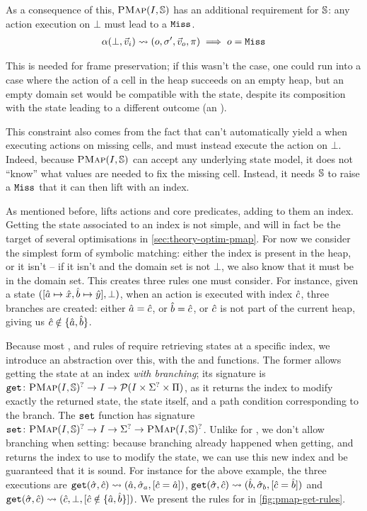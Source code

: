 As a consequence of this, $\textsc{PMap}(I,\mathbb S)$ has an additional requirement for $\mathbb S$: any action execution on $\bot$ must lead to a $\texttt{Miss}$. \begin{align*}
	\alpha(\bot,\vec{v}_i)\rightsquigarrow(o,\sigma',\vec{v}_o,\pi) \implies o=\texttt{Miss}
\end{align*}

This is needed for frame preservation; if this wasn't the case, one could run into a case where the action of a cell in the heap succeeds on an empty heap, but an empty domain set would be compatible with the state, despite its composition with the state leading to a different outcome (an \Err).

This constraint also comes from the fact that \PMap{} can't automatically yield a \Miss{} when executing actions on missing cells, and must instead execute the action on $\bot$. Indeed, because $\textsc{PMap}(I,\mathbb S)$ can accept any underlying state model, it does not ``know'' what values are needed to fix the missing cell. Instead, it needs $\mathbb S$ to raise a $\texttt{Miss}$ that it can then lift with an index.

As mentioned before, \PMap{} lifts actions and core predicates, adding to them an index. Getting the state associated to an index is not simple, and will in fact be the target of several optimisations in \cref{sec:theory-optim-pmap}. For now we consider the simplest form of symbolic matching: either the index is present in the heap, or it isn't -- if it isn't and the domain set is not $\bot$, we also know that it must be in the domain set. This creates three rules one must consider. For instance, given a state $([\hat{a}\mapsto \hat{x}, \hat{b} \mapsto \hat{y}], \bot)$, when an action is executed with index $\hat{c}$, three branches are created: either $\hat{a} = \hat{c}$, or $\hat{b} = \hat{c}$, or $\hat{c}$ is not part of the current heap, giving us $\hat{c}\notin \{\hat{a},\hat{b}\}$.

Because most \execac, \consume{} and \produce{} rules of \PMap{} require retrieving states at a specific index, we introduce an abstraction over this, with the  and  functions. The former allows getting the state at an index \emph{with branching}; its signature is $\texttt{get}\colon \textsc{PMap}(I,\mathbb S)^? \rightarrow I \rightarrow {\cal P}(I \times \Sigma^? \times \Pi)$, as it returns the index to modify exactly the returned state, the state itself, and a path condition corresponding to the branch. The $\texttt{set}$ function has signature $\texttt{set}\colon \textsc{PMap}(I,\mathbb S)^?\rightarrow I \rightarrow \Sigma^? \rightarrow \textsc{PMap}(I,\mathbb S)^?$. Unlike for , we don't allow branching when setting: because branching already happened when getting, and  returns the index to use to modify the state, we can use this new index and be guaranteed that it is sound. For instance for the above example, the three executions are ${\texttt{get}(\hat{\sigma},\hat{c})\rightsquigarrow(\hat{a}, \hat{\sigma}_a, [\hat{c} = \hat{a}])}$, ${\texttt{get}(\hat{\sigma}, \hat{c})\rightsquigarrow(\hat{b}, \hat{\sigma}_b, [\hat{c} = \hat{b}])}$ and ${\texttt{get}(\hat{\sigma},\hat{c})\rightsquigarrow(\hat{c}, \bot, [\hat{c}\notin \{\hat{a},\hat{b}\}])}$. We present the rules for  in \autoref{fig:pmap-get-rules}.

